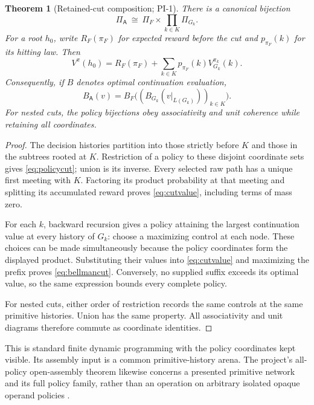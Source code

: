 \documentclass[11pt]{article}
\newtheorem{theorem}{Theorem}[section]
\theoremstyle{definition}
\newcommand{\A}{\mathsf A}
\begin{document}
\begin{theorem}[Retained-cut composition; PI-1]
\label{thm:cut}
There is a canonical bijection
\begin{equation}
 \Pi_\A\ \cong\ \Pi_F\times\prod_{k\in K}\Pi_{G_k}.
 \label{eq:policycut}
\end{equation}
For a root \(h_0\), write \(R_F(\pi_F)\) for expected reward before the
cut and \(p_{\pi_F}(k)\) for its hitting law. Then
\begin{equation}
 V^\pi(h_0)=R_F(\pi_F)+
       \sum_{k\in K}p_{\pi_F}(k)V^{\pi_k}_{G_k}(k).
 \label{eq:cutvalue}
\end{equation}
Consequently, if \(B\) denotes optimal continuation evaluation,
\begin{equation}
 B_\A(v)=B_F\bigl((B_{G_k}(v|_{L(G_k)}))_{k\in K}\bigr).
 \label{eq:bellmancut}
\end{equation}
For nested cuts, the policy bijections obey associativity and unit
coherence while retaining all coordinates.
\end{theorem}
\begin{proof}
The decision histories partition into those strictly before \(K\) and
those in the subtrees rooted at \(K\). Restriction of a policy to these
disjoint coordinate sets gives \eqref{eq:policycut}; union is its inverse.
Every selected raw path has a unique first meeting with \(K\). Factoring
its product probability at that meeting and splitting its accumulated
reward proves \eqref{eq:cutvalue}, including terms of mass zero.

For each \(k\), backward recursion gives a policy attaining the largest
continuation value at every history of \(G_k\): choose a maximizing control
at each node. These choices can be made simultaneously because the policy
coordinates form the displayed product. Substituting their values into
\eqref{eq:cutvalue} and maximizing the prefix proves
\eqref{eq:bellmancut}. Conversely, no supplied suffix exceeds its optimal
value, so the same expression bounds every complete policy.

For nested cuts, either order of restriction records the same controls at
the same primitive histories. Union has the same property. All
associativity and unit diagrams therefore commute as coordinate identities.
\end{proof}

This is standard finite dynamic programming with the policy coordinates
kept visible. Its assembly input is a common primitive-history arena. The
project's all-policy open-assembly theorem likewise concerns a presented
primitive network and its full policy family, rather than an operation on
arbitrary isolated opaque operand policies \cite{transport}.
\end{document}
